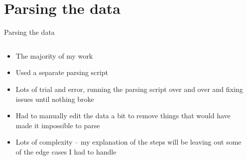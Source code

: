 \documentclass[10pt]{beamer}
\begin{document}
  \section*{Parsing the data}
  \begin{frame}{Parsing the data}
    \begin{columns}[c]
      \begin{column}{0.7\textwidth}
        \begin{itemize}
          \item The majority of my work
          \item Used a separate parsing script
          \item Lots of trial and error, running the parsing script over and over and fixing issues until nothing broke
          \item Had to manually edit the data a bit to remove things that would have made it impossible to parse
          \item Lots of complexity -- my explanation of the steps will be leaving out some of the edge cases I had to handle
        \end{itemize}
      \end{column}
      \begin{column}{0.3\textwidth}
        \centering

\end{column}
\end{columns}
\end{frame}
\end{document}
